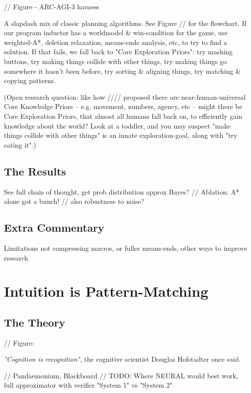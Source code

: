 \documentclass{article}
\begin{document}
// Figure - ARC-AGI-3 harness

A slapdash mix of classic planning algorithms. See Figure // for the flowchart. If our program inductor has a worldmodel \& win-condition for the game, use weighted-A*, deletion relaxation, means-ends analysis, etc, to try to find a solution. If that fails, we fall back to "Core Exploration Priors": try mashing buttons, try making things collide with other things, try making things go somewhere it hasn't been before, try sorting \& aligning things, try matching \& copying patterns.

(Open research question: like how //// proposed there are near-human-universal Core Knowledge Priors -- e.g. movement, numbers, agency, etc -- might there be Core Exploration Priors, that almost all humans fall back on, to efficiently gain knowledge about the world? Look at a toddler, and you may suspect "make things collide with other things" is an innate exploration-goal, along with "try eating it".)

\subsection{The Results}

See full chain of thought, get prob distribution approx Bayes? // Ablation: A* alone got a bunch! // also robustness to noise?

\subsection{Extra Commentary}

Limitations not compressing macros, or fuller means-ends, other ways to improve research


\section{Intuition is Pattern-Matching}

\subsection{The Theory}

// Figure: 

\textit{"Cognition is recognition"}, the cognitive scientist Douglas Hofstadter once said.

// Pandaemonium, Blackboard
// TODO: Where NEURAL would best work, full approximator with verifier "System 1" vs "System 2"
\end{document}

